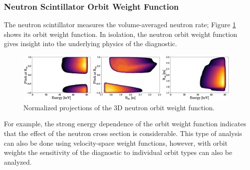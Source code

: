 \subsubsection{Neutron Scintillator Orbit Weight Function}
The neutron scintillator measures the volume-averaged neutron rate; Figure \ref{fig:neutron_orbit_weight} shows its orbit weight function.
In isolation, the neutron orbit weight function gives insight into the underlying physics of the diagnostic.
\begin{figure}[h!]
    \centering
    \includegraphics[width=17cm]{figures/neutron_orbit_weight.eps}
    \caption{Normalized projections of the 3D neutron orbit weight function.}
    \label{fig:neutron_orbit_weight}
\end{figure}
For example, the strong energy dependence of the orbit weight function indicates that the effect of the neutron cross section is considerable. This type of analysis can also be done using velocity-space weight functions, however, with orbit weights the sensitivity of the diagnostic to individual orbit types can also be analyzed.
